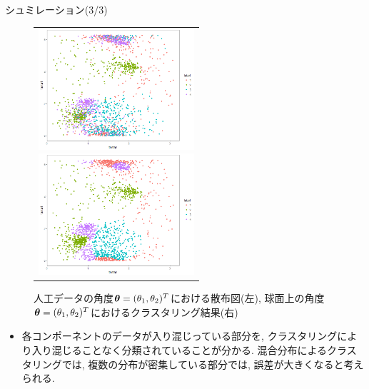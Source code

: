 \documentclass[dvipdfmx]{beamer} %
\newcommand{\bm}[1]{\mbox{\boldmath $#1$}}
\begin{document}
\begin{frame}{シュミレーション(3/3)}

\vspace{-1zh}
\begin{figure}[H]
\begin{tabular}{c}

\begin{minipage}{0.5\hsize}
\begin{center}
\includegraphics[clip,height= 45mm]{data/real.png}
\end{center}
\end{minipage}

\begin{minipage}{0.5\hsize}
\begin{center}
\includegraphics[clip,height= 45mm]{data/pred.png}
\end{center}
\end{minipage}
\end{tabular}
\caption{人工データの角度$\bm \theta = (\theta_1, \theta_2)^T$における散布図(左), 球面上の角度$\bm \theta = (\theta_1, \theta_2)^T$におけるクラスタリング結果(右)}
\end{figure}

\begin{itemize}
\item
各コンポーネントのデータが入り混じっている部分を, クラスタリングにより入り混じることなく分類されていることが分かる. 混合分布によるクラスタリングでは, 複数の分布が密集している部分では, 誤差が大きくなると考えられる.
\end{itemize}

\end{frame}
\end{document}
